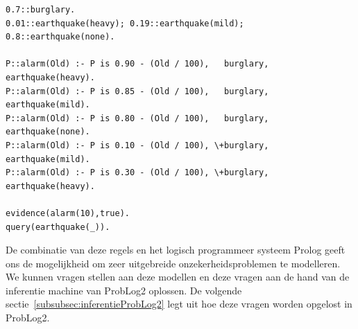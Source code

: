 \documentclass[12pt,a4paper,oneside]{book}
\theoremstyle{definition}
\begin{document}
\begin{lstlisting}
0.7::burglary.
0.01::earthquake(heavy); 0.19::earthquake(mild); 0.8::earthquake(none).

P::alarm(Old) :- P is 0.90 - (Old / 100),   burglary, earthquake(heavy).
P::alarm(Old) :- P is 0.85 - (Old / 100),   burglary, earthquake(mild).
P::alarm(Old) :- P is 0.80 - (Old / 100),   burglary, earthquake(none).
P::alarm(Old) :- P is 0.10 - (Old / 100), \+burglary, earthquake(mild).
P::alarm(Old) :- P is 0.30 - (Old / 100), \+burglary, earthquake(heavy).

evidence(alarm(10),true).
query(earthquake(_)).
\end{lstlisting}
De combinatie van deze regels en het logisch programmeer systeem Prolog geeft ons de mogelijkheid om zeer uitgebreide onzekerheidsproblemen te modelleren. We kunnen vragen stellen aan deze modellen en deze vragen aan de hand van de inferentie machine van ProbLog2 oplossen. De volgende sectie~\ref{subsubsec:inferentieProbLog2} legt uit hoe deze vragen worden opgelost in ProbLog2.
\end{document}
